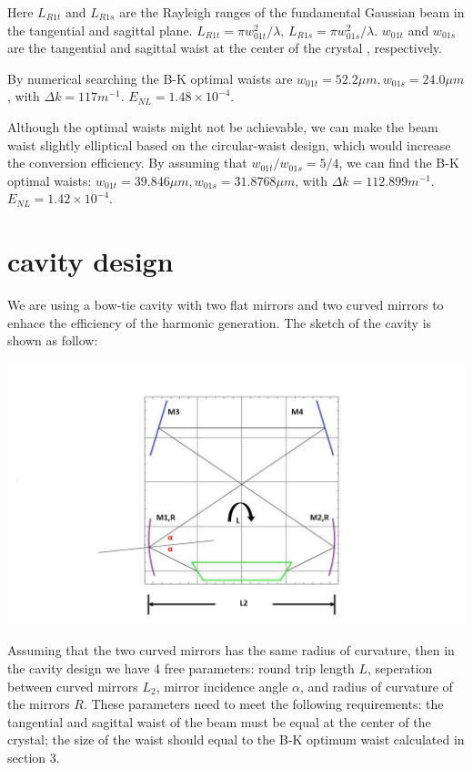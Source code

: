 \documentclass{article}
\begin{document}
Here $L_{R1t}$ and $L_{R1s}$ are the Rayleigh ranges of the fundamental Gaussian beam in the tangential and sagittal plane. $L_{R1t}={\pi}w_{01t}^2/\lambda$, $L_{R1s}={\pi}w_{01s}^2/\lambda$. $w_{01t}$ and $w_{01s}$ are the tangential and sagittal waist at the center of the crystal , respectively.

By numerical searching the B-K optimal waists are $w_{01t}=52.2{\mu}m, w_{01s}=24.0{\mu}m$, with ${\Delta}k=117m^{-1}$. $E_{NL}=1.48\times10^{-4}$. 

Although the optimal waists might not be achievable, we can make the beam waist slightly elliptical based on the circular-waist design, which would increase the conversion efficiency. By assuming that ${w_{01t}}/{w_{01s}}=5/4$, we can find the B-K optimal waists: $w_{01t}=39.846{\mu}m, w_{01s}=31.8768{\mu}m$, with ${\Delta}k=112.899m^{-1}$. $E_{NL}=1.42\times10^{-4}$. 

\section{cavity design}
We are using a bow-tie cavity with two flat mirrors and two curved mirrors to enhace the efficiency of the harmonic generation. The sketch of the cavity is shown as follow:

\includegraphics[height=3in]{bcut1.JPG}

Assuming that the two curved mirrors has the same radius of curvature, then in the cavity design we have 4 free parameters: round trip length $L$, seperation between curved mirrors $L_2$, mirror incidence angle $\alpha$, and radius of curvature of the mirrors $R$. These parameters need to meet the following requirements: the tangential and sagittal waist of the beam must be equal at the center of the crystal; the size of the waist should equal to the B-K optimum waist calculated in section 3. 
\end{document}
